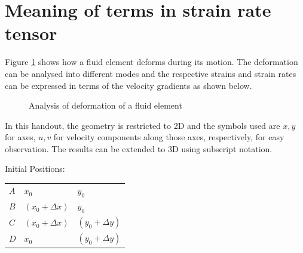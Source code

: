 \section{Meaning of terms in strain rate tensor}
\label{strainratemeaning}

Figure \ref{fluidelement} shows how a fluid element deforms during its motion. The deformation can be analysed into different modes and the respective strains and strain rates can be expressed in terms of the velocity gradients as shown below.


\begin{figure}[h]
\caption{Analysis of deformation of a fluid element}
\label{fluidelement}
\end{figure}

\setlength{\parskip}{5mm}
\setlength{\parindent}{0mm}


In this handout, the geometry is restricted to 2D and the symbols used are $x,y$ for axes, $u,v$ for velocity components along those axes, respectively, for easy observation. The results can be extended to 3D using subscript notation.


Initial Positions:

\begin{tabular}{|l|l|l|}
\hline
$A$ & $x_0$ & $y_0$ \\

$B$ & $(x_0 + \Delta x)$ & $y_0$ \\

$C$ & $(x_0 + \Delta x)$ & $(y_0 + \Delta y)$ \\

$D$ & $x_0$ & $(y_0 + \Delta y)$ \\
\hline
\end{tabular}


